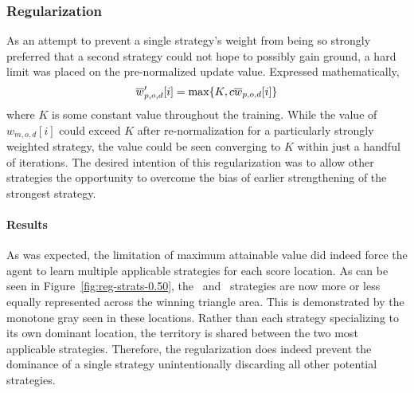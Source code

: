 

\subsubsection*{Regularization}


As an attempt to prevent a single strategy's weight from being so strongly 
preferred that a second strategy could not hope to possibly gain ground,
a hard limit was placed on the pre-normalized update value.
%
Expressed mathematically,
\[
    \overline{w}'_{p,o,d}[i] = \max\{K,c\overline{w}_{p,o,d}[i]\}
\]
where $K$ is some constant value throughout the training.
%
While the value of $w_{m,o,d}[i]$ could exceed $K$ after re-normalization
for a particularly strongly weighted strategy,
the value could be seen converging to $K$ within just a handful of iterations.
%
The desired intention of this regularization was to allow other strategies
the opportunity to overcome the bias of earlier strengthening of the strongest
strategy.

\paragraph*{Results}







As was expected,
the limitation of maximum attainable value did indeed force the agent to learn
multiple applicable strategies for each score location.
%
As can be seen in Figure~\ref{fig:reg-strats-0.50},
the \handmaxmin\ and \handmaxavg\ strategies are now 
more or less equally represented across the winning triangle area.
%
This is demonstrated by the monotone gray seen in these locations.
%
Rather than each strategy specializing to its own dominant location,
the territory is shared between the two most applicable strategies.
%
Therefore,
the regularization does indeed prevent the dominance of a single strategy
unintentionally discarding all other potential strategies.

